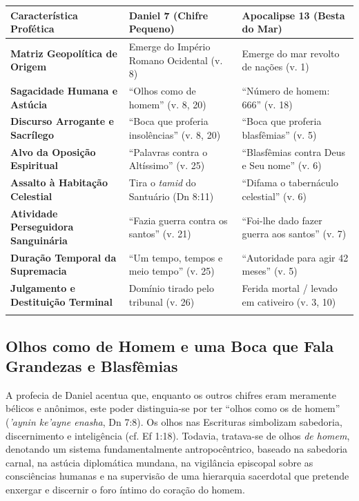 \documentclass[11pt,a4paper,openany]{book}
\begin{document}
\begin{table}[htbp]
\centering
\footnotesize
\setlength{\tabcolsep}{5pt}
\renewcommand{\arraystretch}{1.25}
\begin{tabularx}{\textwidth}{>{\raggedright\arraybackslash}p{} >{\raggedright\arraybackslash}X >{\raggedright\arraybackslash}X}
\toprule
\textbf{Característica Profética} & \textbf{Daniel 7 (Chifre Pequeno)} & \textbf{Apocalipse 13 (Besta do Mar)} \\
\midrule
\textbf{Matriz Geopolítica de Origem} & Emerge do Império Romano Ocidental (v. 8) & Emerge do mar revolto de nações (v. 1) \\
\addlinespace[3pt]
\textbf{Sagacidade Humana e Astúcia} & ``Olhos como de homem'' (v. 8, 20) & ``Número de homem: 666'' (v. 18) \\
\addlinespace[3pt]
\textbf{Discurso Arrogante e Sacrílego} & ``Boca que proferia insolências'' (v. 8, 20) & ``Boca que proferia blasfêmias'' (v. 5) \\
\addlinespace[3pt]
\textbf{Alvo da Oposição Espiritual} & ``Palavras contra o Altíssimo'' (v. 25) & ``Blasfêmias contra Deus e Seu nome'' (v. 6) \\
\addlinespace[3pt]
\textbf{Assalto à Habitação Celestial} & Tira o \textit{tamid} do Santuário (Dn 8:11) & ``Difama o tabernáculo celestial'' (v. 6) \\
\addlinespace[3pt]
\textbf{Atividade Perseguidora Sanguinária} & ``Fazia guerra contra os santos'' (v. 21) & ``Foi-lhe dado fazer guerra aos santos'' (v. 7) \\
\addlinespace[3pt]
\textbf{Duração Temporal da Supremacia} & ``Um tempo, tempos e meio tempo'' (v. 25) & ``Autoridade para agir 42 meses'' (v. 5) \\
\addlinespace[3pt]
\textbf{Julgamento e Destituição Terminal} & Domínio tirado pelo tribunal (v. 26) & Ferida mortal / levado em cativeiro (v. 3, 10) \\
\addlinespace[3pt]
\bottomrule
\end{tabularx}
\end{table}




\subsection{Olhos como de Homem e uma Boca que Fala Grandezas e Blasfêmias}


A profecia de Daniel acentua que, enquanto os outros chifres eram meramente bélicos e anônimos, este poder distinguia-se por ter ``olhos como os de homem'' (\textit{'aynin ke'ayne enasha}, Dn 7:8). Os olhos nas Escrituras simbolizam sabedoria, discernimento e inteligência (cf. Ef 1:18). Todavia, tratava-se de olhos \textit{de homem}, denotando um sistema fundamentalmente antropocêntrico, baseado na sabedoria carnal, na astúcia diplomática mundana, na vigilância episcopal sobre as consciências humanas e na supervisão de uma hierarquia sacerdotal que pretende enxergar e discernir o foro íntimo do coração do homem.
\end{document}
